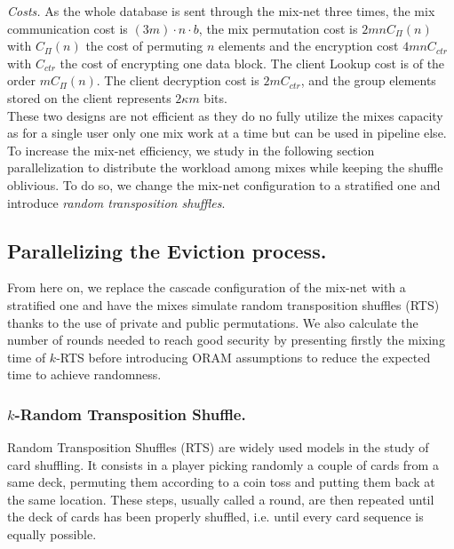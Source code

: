 \documentclass{llncs}
\begin{document}
\noindent\textit{Costs.}
As the whole database is sent through the mix-net three times, the mix communication cost is $ (3m) \cdot n \cdot b$, the mix permutation cost is $2mn C_{\Pi}(n)$ with $C_{\Pi}(n)$ the cost of permuting $n$ elements and the encryption cost $4 m n C_{ctr}$ with $C_{ctr}$ the cost of encrypting one data block. The client Lookup cost is of the order $m C_{\Pi}(n)$. The client decryption cost is $2mC_{ctr}$, and the group elements stored on the client represents $2\kappa m$ bits.\\

These two designs are not efficient as they do no fully utilize the mixes capacity as for a single user only one mix work at a time but can be used in pipeline else. To increase the mix-net efficiency, we study in the following section parallelization to distribute the workload among mixes while keeping the shuffle oblivious. To do so, we change the mix-net configuration to a stratified one and introduce \emph{random transposition shuffles}.

\subsection{Parallelizing the Eviction process.}\label{Parallel}
From here on, we replace the cascade configuration of the mix-net with a stratified one and have the mixes simulate random transposition shuffles (RTS) thanks to the use of private and public permutations. We also calculate the number of rounds needed to reach good security by presenting firstly the mixing time of $k$-RTS before introducing ORAM assumptions to reduce the expected time to achieve randomness.

\subsubsection{$k$-Random Transposition Shuffle.}\label{kRTS}
Random Transposition Shuffles (RTS) are widely used models in the study of card shuffling. It consists in a player picking randomly a couple of cards from a same deck, permuting them according to a coin toss and putting them back at the same location.
These steps, usually called a round, are then repeated until the deck of cards has been properly shuffled, i.e. until every card sequence is equally possible.
\end{document}
